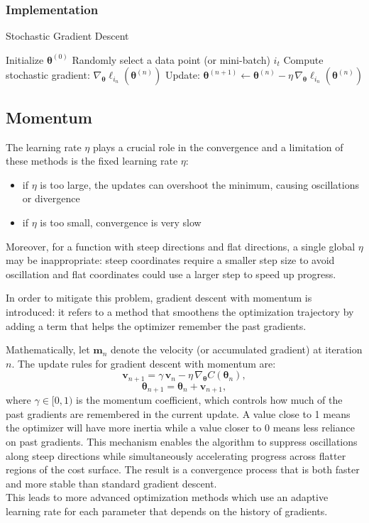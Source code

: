 \documentclass[
 reprint,            %
 amsmath,amssymb,
 aps,
]{revtex4-2}
\begin{document}
\subsubsection{Implementation}
\begin{algorithm}[H]
\caption{Stochastic Gradient Descent}
\begin{algorithmic}[1]
\State Initialize $\boldsymbol{\theta}^{(0)}$
    \State Randomly select a data point (or mini-batch) $i_t$
    \State Compute stochastic gradient: $\nabla_{\boldsymbol{\theta}} \ell_{i_n}(\boldsymbol{\theta}^{(n)})$
    \State Update: $\boldsymbol{\theta}^{(n+1)} \gets \boldsymbol{\theta}^{(n)} - \eta \, \nabla_{\boldsymbol{\theta}} \ell_{i_n}(\boldsymbol{\theta}^{(n)})$
\EndFor
\end{algorithmic}
\end{algorithm}

\subsection{Momentum}
The learning rate $\eta$ plays a crucial role in the convergence and a limitation of these methods is the fixed learning rate ${\eta}$: 
\begin{itemize}
    \item if $\eta$ is too large, the updates can overshoot the minimum, causing oscillations or divergence
    \item if $\eta$ is too small, convergence is very slow
\end{itemize}
Moreover, for a function with steep directions and flat directions, a single global $ \eta$ may be inappropriate:
steep coordinates require a smaller step size to avoid oscillation and flat coordinates could use a larger step to speed up progress.

In order to mitigate this problem, gradient descent with momentum is introduced: it refers to a method that smoothens the optimization trajectory by adding a term that helps the optimizer remember the past gradients.

Mathematically, let $\boldsymbol{m}_n$ denote the velocity (or accumulated gradient) at iteration $n$. The update rules for gradient descent with momentum are:
$$
\boldsymbol{v}_{n+1} = \gamma \, \boldsymbol{v}_n - \eta \, \nabla_{\boldsymbol{\theta}} C(\boldsymbol{\theta}_n),
$$
$$
\boldsymbol{\theta}_{n+1} = \boldsymbol{\theta}_n + \boldsymbol{v}_{n+1},
$$
where $\gamma \in [0,1)$ is the momentum coefficient, which controls how much of the past gradients are remembered in the current update. A value close to 1 means the optimizer will have more inertia while a value closer to 0 means less reliance on past gradients. This mechanism enables the algorithm to suppress oscillations along steep directions while simultaneously accelerating progress across flatter regions of the cost surface. The result is a convergence process that is both faster and more stable than standard gradient descent.\\
This leads to more advanced optimization methods which use an adaptive learning rate for each parameter that depends on the history of gradients.\\
\end{document}

